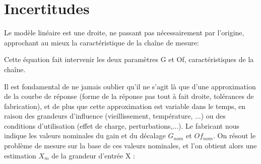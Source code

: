 \section{Incertitudes}

Le modèle linéaire est une droite, ne passant pas nécessairement par l'origine, approchant au mieux la caractéristique de la chaîne de mesure:
\begin{center}
\end{center}

Cette équation fait intervenir les deux paramètres G et Of, caractéristiques de la chaîne.
\begin{center}
\end{center}

Il est fondamental de ne jamais oublier qu'il ne s'agit là que d'une approximation de la courbe de réponse (forme de la réponse pas tout à fait droite, tolérances de fabrication), et de plus que cette approximation est variable dans le temps, en raison des grandeurs d'influence (vieillissement, température, ...) ou des conditions d'utilisation (effet de charge, perturbations,...). Le fabricant nous indique les valeurs nominales du gain et du décalage $G_{nom}$ et $Of_{nom}$.
On résout le problème de mesure sur la base de ces valeurs nominales, et l'on obtient alors une estimation $X_{m}$ de la grandeur d'entrée X :
\begin{center}
\end{center}

